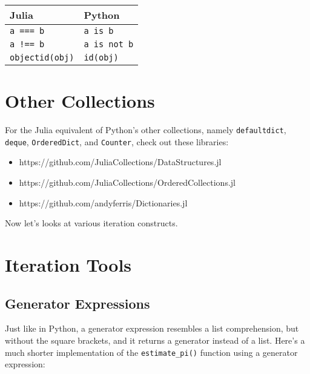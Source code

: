 \documentclass[11pt]{article}
\providecommand{\tightlist}{%
      \setlength{\itemsep}{0pt}\setlength{\parskip}{0pt}}
\begin{document}
    \begin{longtable}[]{@{}ll@{}}
\toprule
Julia & Python \\
\midrule
\endhead
\texttt{a\ ===\ b} & \texttt{a\ is\ b} \\
\texttt{a\ !==\ b} & \texttt{a\ is\ not\ b} \\
\texttt{objectid(obj)} & \texttt{id(obj)} \\
\bottomrule
\end{longtable}

    \hypertarget{other-collections}{%
\section{Other Collections}\label{other-collections}}

For the Julia equivalent of Python's other collections, namely
\texttt{defaultdict}, \texttt{deque}, \texttt{OrderedDict}, and
\texttt{Counter}, check out these libraries:

\begin{itemize}
\tightlist
\item
  https://github.com/JuliaCollections/DataStructures.jl
\item
  https://github.com/JuliaCollections/OrderedCollections.jl
\item
  https://github.com/andyferris/Dictionaries.jl
\end{itemize}

    Now let's looks at various iteration constructs.

    \hypertarget{iteration-tools}{%
\section{Iteration Tools}\label{iteration-tools}}

    \hypertarget{generator-expressions}{%
\subsection{Generator Expressions}\label{generator-expressions}}

Just like in Python, a generator expression resembles a list
comprehension, but without the square brackets, and it returns a
generator instead of a list. Here's a much shorter implementation of the
\texttt{estimate\_pi()} function using a generator expression:
\end{document}
